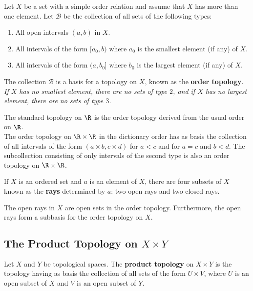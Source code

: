 \begin{definition}
Let $X$ be a set with a simple order relation and assume that $X$ has more than one element. Let $\mathscr{B}$ be the collection
of all sets of the following types:
\begin{enumerate}
    \item All open intervals $(a, b)$ in $X$.
    \item All intervals of the form $[a_0, b)$ where $a_0$ is the smallest element (if any) of $X$.
    \item All intervals of the form $(a, b_0]$ where $b_0$ is the largest element (if any) of $X$.
\end{enumerate}

The collection $\mathscr{B}$ is a basis for a topology on $X$, known as the \textbf{order topology}. \\

\textit{If $X$ has no smallest element, there are no sets of type $2$, and if $X$ has no largest element, there are no sets of type $3$.}
\end{definition}

\begin{eg}
The standard topology on $\R$ is the order topology derived from the usual order on $\R$. \\

The order topology on $\R \times \R$ in the dictionary order has as basis the collection of all intervals of the form $(a \times b, c \times d)$
for $a < c$ and for $a = c$ and $b < d$. The subcollection consisting of only intervals of the second type is also an order topology on $\R \times \R$.
\end{eg}

\begin{definition}[Rays of $X$]
If $X$ is an ordered set and $a$ is an element of $X$, there are four subsets of $X$ known as the \textbf{rays} determined by $a$: two open rays and two closed rays.
\end{definition}
\begin{remark}
The open rays in $X$ are open sets in the order topology. Furthermore, the open rays form a subbasis for the order topology on $X$.
\end{remark}

\subsection{The Product Topology on $X \times Y$}
\begin{definition}
Let $X$ and $Y$ be topological spaces. The \textbf{product topology} on $X \times Y$ is the topology having as basis the collection
of all sets of the form $U \times V$, where $U$ is an open subset of $X$ and $V$ is an open subset of $Y$.
\end{definition}

